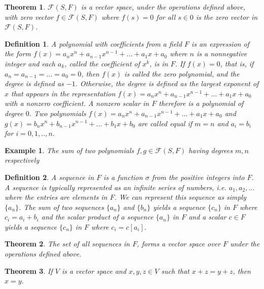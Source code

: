 \documentclass[a4paper]{article}
\newtheorem{mytheorem}{Theorem}
\newtheorem{example}{Example}
\newtheorem{mydef}{Definition}
\numberwithin{mytheorem}{section}
\numberwithin{mydef}{section}
\numberwithin{example}{section}
\begin{document}
\begin{mytheorem} $\mathcal{F}(S,F)$ is a vector space, under the operations defined above, with zero vector $f \in \mathcal{F}(S,F)$ where $f(s) = 0$ for all $s \in 0$ is the zero vector in $\mathcal{F}(S,F)$.   \end{mytheorem}

\begin{mydef} A polynomial with coefficients from a field $F$ is an expression of the form $f(x) = a_{n}x^{n} + a_{n-1}x^{n-1} + ... + a_{1}x + a_{0}$ where $n$ is a nonnegative integer and each $a_{k}$, called the coefficient of $x^{k}$, is in $F$. If $f(x) = 0$, that is, if $a_{n} = a_{n-1} = ... = a_{0} = 0$, then $f(x)$ is called the zero polynomial, and the degree is defined as $-1$. Otherwise, the degree is defined as the largest exponent of $x$ that appears in the representation $f(x) = a_{n}x^{n} + a_{n-1}x^{n-1} + ... + a_{1}x + a_{0}$ with a nonzero coefficient. A nonzero scalar in $F$ therefore is a polynomial of degree $0$. Two polynomials $f(x) = a_{n}x^{n} + a_{n-1}x^{n-1} + ... + a_{1}x + a_{0}$ and $g(x) = b_{n}x^{n} + b_{n-1}x^{n-1} + ... + b_{1}x + b_{0}$ are called equal if $m = n$ and $a_{i} = b_{i}$ for $i = 0,1,..,n$.  
\end{mydef}

\begin{example}
The sum of two polynomials $f,g \in \mathcal{F}(S,F)$ having degrees $m,n$ respectively 
\end{example}

\begin{mydef} A sequence in $F$ is a function $\sigma$ from the positive integers into $F$. A sequence is typically represented as an infinite series of numbers, i.e.  $a_{1},a_{2},...$ where the entries are elements in $F$. We can represent this sequence as simply $\{ a_{n} \}$. The sum of two sequences $\{ a_{n} \}$ and $\{ b_{n} \}$ yields a sequence $\{ c_{n} \}$ in $F$ where $c_{i} = a_{i} + b_{i}$ and the scalar product of a sequence $\{ a_{n} \}$ in $F$ and a scalar $c \in F$ yields a sequence $\{ c_{n} \}$ in $F$ where $c_{i} = c[a_{i}]$.  
\end{mydef}

\begin{mytheorem} The set of all sequences in $F$, forms a vector space over $F$ under the operations defined above.  \end{mytheorem}

\begin{mytheorem} If $V$ is a vector space and $x,y,z \in V$ such that $x + z = y + z$, then $x = y$. \end{mytheorem}
\end{document}
